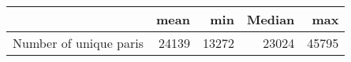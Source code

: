 \begin{tabular}{lrrrr}
\toprule
{} &   mean &    min &  Median &    max \\
\midrule
Number of unique paris &  24139 &  13272 &   23024 &  45795 \\
\bottomrule
\end{tabular}
